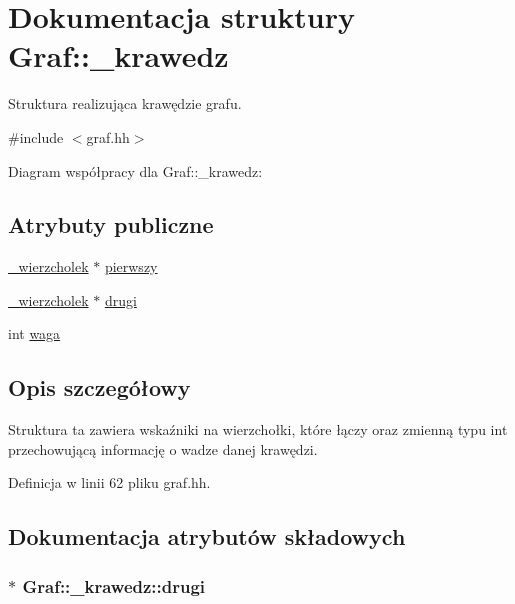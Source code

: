 \hypertarget{struct_graf_1_1__krawedz}{\section{\-Dokumentacja struktury \-Graf\-:\-:\-\_\-krawedz}
\label{struct_graf_1_1__krawedz}
}


\-Struktura realizująca krawędzie grafu.  




{\ttfamily \#include $<$graf.\-hh$>$}



\-Diagram współpracy dla \-Graf\-:\-:\-\_\-krawedz\-:
\subsection*{\-Atrybuty publiczne}
\begin{DoxyCompactItemize}
\item 
\hyperlink{struct_graf_1_1__wierzcholek}{\-\_\-wierzcholek} $\ast$ \hyperlink{struct_graf_1_1__krawedz_adba487ff1b27ab413c139dff7ef02313}{pierwszy}
\item 
\hyperlink{struct_graf_1_1__wierzcholek}{\-\_\-wierzcholek} $\ast$ \hyperlink{struct_graf_1_1__krawedz_a089375425bc7f1cb193f02f7bae87e4a}{drugi}
\item 
int \hyperlink{struct_graf_1_1__krawedz_a32556165c01ba902034186551780c7f4}{waga}
\end{DoxyCompactItemize}


\subsection{\-Opis szczegółowy}
\-Struktura ta zawiera wskaźniki na wierzchołki, które łączy oraz zmienną typu int przechowującą informację o wadze danej krawędzi. 

\-Definicja w linii 62 pliku graf.\-hh.



\subsection{\-Dokumentacja atrybutów składowych}
\hypertarget{struct_graf_1_1__krawedz_a089375425bc7f1cb193f02f7bae87e4a}{
\subsubsection[{drugi}]{$\ast$ {\bf \-Graf\-::\-\_\-krawedz\-::drugi}}}\label{struct_graf_1_1__krawedz_a089375425bc7f1cb193f02f7bae87e4a}


